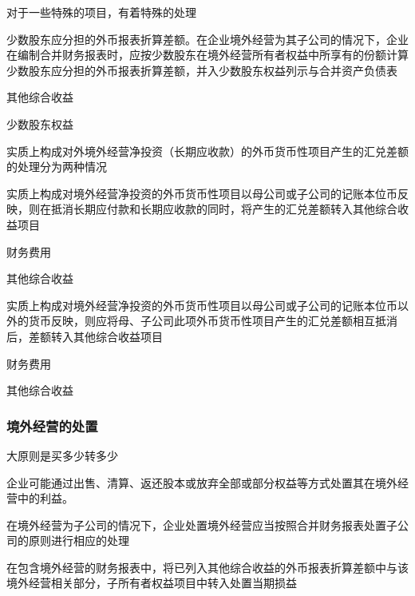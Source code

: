 \documentclass[UTF8,12pt]{ctexart}
\newenvironment{Dr}{%
	\begin{list}{}%
		{
			\setlength{\leftmargin}{2em}
			\setlength{\labelwidth}{2em}
			\setlength{\labelsep}{0pt}
			\setlength{\itemindent}{0pt}
			\setlength{\listparindent}{0pt}
			\setlength{\parsep}{0pt}
			\setlength{\topsep}{0pt}
		}
		\item[\textbf{借：}]
	}{%
	\end{list}
}
\newenvironment{Cr}{%
	\begin{list}{}%
		{
			\setlength{\leftmargin}{3em}
			\setlength{\labelwidth}{2em}
			\setlength{\labelsep}{0pt}
			\setlength{\itemindent}{0pt}
			\setlength{\listparindent}{0pt}
			\setlength{\parsep}{0pt}
			\setlength{\topsep}{0pt}
		}
		\item[\textbf{贷：}]
	}{%
	\end{list}
}
\numberwithin{equation}{section} %
\numberwithin{figure}{section}
\numberwithin{table}{section}
\begin{document}
	对于一些特殊的项目，有着特殊的处理
	\begin{enumerate}
		\item 少数股东应分担的外币报表折算差额。在企业境外经营为其子公司的情况下，企业在编制合并财务报表时，应按少数股东在境外经营所有者权益中所享有的份额计算少数股东应分担的外币报表折算差额，并入少数股东权益列示与合并资产负债表
		\begin{Dr}
			其他综合收益
		\end{Dr}
		\begin{Cr}
			少数股东权益
		\end{Cr}
		
		\item 实质上构成对外境外经营净投资（长期应收款）的外币货币性项目产生的汇兑差额的处理分为两种情况
		\begin{enumerate}
			\item 实质上构成对境外经营净投资的外币货币性项目以母公司或子公司的记账本位币反映，则在抵消长期应付款和长期应收款的同时，将产生的汇兑差额转入其他综合收益项目
			\begin{Dr}
				财务费用
			\end{Dr}
			\begin{Cr}
				其他综合收益
			\end{Cr}
			
			\item 实质上构成对境外经营净投资的外币货币性项目以母公司或子公司的记账本位币以外的货币反映，则应将母、子公司此项外币货币性项目产生的汇兑差额相互抵消后，差额转入其他综合收益项目
			\begin{Dr}
			财务费用
			\end{Dr}
			\begin{Cr}
			其他综合收益
			\end{Cr}
		\end{enumerate}
	\end{enumerate}
	
	\subsubsection{境外经营的处置}
	大原则是买多少转多少
	
	企业可能通过出售、清算、返还股本或放弃全部或部分权益等方式处置其在境外经营中的利益。
	
	在境外经营为子公司的情况下，企业处置境外经营应当按照合并财务报表处置子公司的原则进行相应的处理
	
	在包含境外经营的财务报表中，将已列入其他综合收益的外币报表折算差额中与该境外经营相关部分，子所有者权益项目中转入处置当期损益
	
\end{document}
